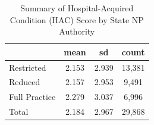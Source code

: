 \begin{table}[htbp]\centering
\def\sym#1{\ifmmode^{#1}\else\(^{#1}\)\fi}
\caption{Summary of Hospital-Acquired Condition (HAC) Score by State NP Authority}
\begin{tabular}{l*{1}{ccc}}
\toprule
                    &        mean&          sd&       count\\
\midrule
Restricted          &       2.153&       2.939&      13,381\\
Reduced             &       2.157&       2.953&       9,491\\
Full Practice       &       2.279&       3.037&       6,996\\
Total               &       2.184&       2.967&      29,868\\
\bottomrule
\end{tabular}
\end{table}
